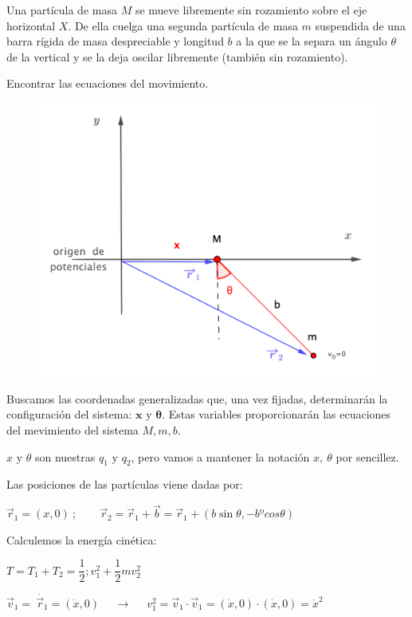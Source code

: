 \begin{example}

\vspace{3mm} 
Una partícula de masa $M$ se mueve libremente sin rozamiento sobre el eje horizontal $X$. De ella cuelga una segunda partícula de masa $m$ suspendida de una barra rígida de masa despreciable y longitud $b$ a la que se la separa un ángulo $\theta$ de la vertical y se la deja oscilar libremente (también sin rozamiento). 	
	
	Encontrar las ecuaciones del movimiento.
	
	\begin{figure}[H]
		\centering
		\includegraphics[width=.75\textwidth]{imagenes/img03-01.png}
		\end{figure}	
\end{example}

Buscamos las coordenadas generalizadas que, una vez fijadas, determinarán la configuración del sistema: $\boldsymbol x$ y $\boldsymbol \theta$. Estas variables proporcionarán las ecuaciones del mevimiento del sistema $M, m, b$.

$x \text{ y } \theta$ son nuestras $q_1 \text{ y } q_2$, pero vamos a mantener la notación $x,\ \theta$ por sencillez.

Las posiciones de las partículas viene dadas por:

$\overrightarrow r_1 = (x,0)\ ; \qquad \overrightarrow r_2=\overrightarrow r_1 + \overrightarrow b = \overrightarrow r_1 + (b\sin \theta, -b ºcos \theta)$

Calculemos la energía cinética:

$T=T_1+T_2=\dfrac 1 2 ; v_1^2 + \dfrac 1 2 m v_2^2$

$\overrightarrow v_1= \dot{\ \overrightarrow r_1}=(\dot x, 0)$
$ \quad \longrightarrow \quad$
$v_1^2=\overrightarrow v_1 \cdot \overrightarrow v_1 = (\dot x,0) \cdot (\dot x, 0)={\dot x}^2$

